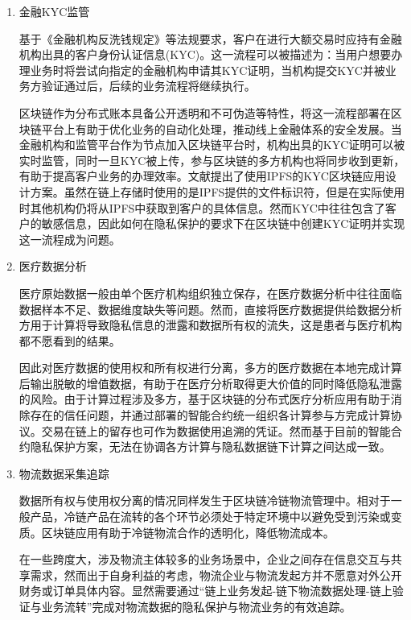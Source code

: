 \begin{enumerate}
\item 金融KYC监管

基于《金融机构反洗钱规定》等法规要求，客户在进行大额交易时应持有金融机构出具的客户身份认证信息(KYC)。这一流程可以被描述为：当用户想要办理业务时将尝试向指定的金融机构申请其KYC证明，当机构提交KYC并被业务方验证通过后，后续的业务流程将继续执行。

区块链作为分布式账本具备公开透明和不可伪造等特性，将这一流程部署在区块链平台上有助于优化业务的自动化处理，推动线上金融体系的安全发展。当金融机构和监管平台作为节点加入区块链平台时，机构出具的KYC证明可以被实时监管，同时一旦KYC被上传，参与区块链的多方机构也将同步收到更新，有助于提高客户业务的办理效率。文献\cite{fi12020041}提出了使用IPFS的KYC区块链应用设计方案。虽然在链上存储时使用的是IPFS提供的文件标识符，但是在实际使用时其他机构仍将从IPFS中获取到客户的具体信息。然而KYC中往往包含了客户的敏感信息，因此如何在隐私保护的要求下在区块链中创建KYC证明并实现这一流程成为问题。

\item 医疗数据分析

医疗原始数据一般由单个医疗机构组织独立保存，在医疗数据分析中往往面临数据样本不足、数据维度缺失等问题。然而，直接将医疗数据提供给数据分析方用于计算将导致隐私信息的泄露和数据所有权的流失，这是患者与医疗机构都不愿看到的结果。

因此对医疗数据的使用权和所有权进行分离，多方的医疗数据在本地完成计算后输出脱敏的增值数据，有助于在医疗分析取得更大价值的同时降低隐私泄露的风险。由于计算过程涉及多方，基于区块链的分布式医疗分析应用有助于消除存在的信任问题，并通过部署的智能合约统一组织各计算参与方完成计算协议。交易在链上的留存也可作为数据使用追溯的凭证。然而基于目前的智能合约隐私保护方案，无法在协调各方计算与隐私数据链下计算之间达成一致。
    
\item 物流数据采集追踪

数据所有权与使用权分离的情况同样发生于区块链冷链物流管理中。相对于一般产品，冷链产品在流转的各个环节必须处于特定环境中以避免受到污染或变质。区块链应用有助于冷链物流合作的透明化，降低物流成本。

在一些跨度大，涉及物流主体较多的业务场景中，企业之间存在信息交互与共享需求，然而出于自身利益的考虑，物流企业与物流发起方并不愿意对外公开财务或订单具体内容。显然需要通过“链上业务发起-链下物流数据处理-链上验证与业务流转”完成对物流数据的隐私保护与物流业务的有效追踪。

\end{enumerate}

